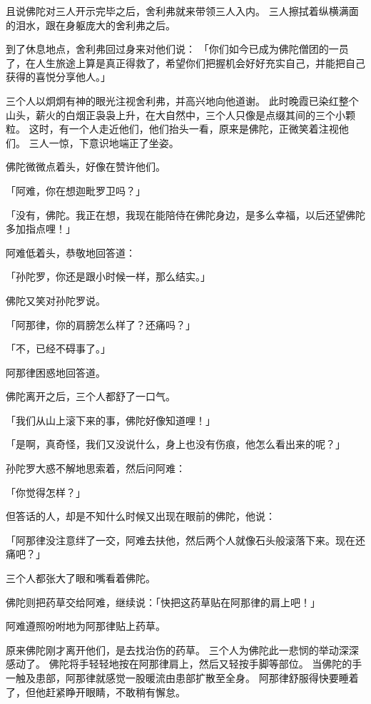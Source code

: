 \documentclass[twoside,openany]{book}
\begin{document}
且说佛陀对三人开示完毕之后，舍利弗就来带领三人入内。
三人擦拭着纵横满面的泪水，跟在身躯庞大的舍利弗之后。

到了休息地点，舍利弗回过身来对他们说：
「你们如今已成为佛陀僧团的一员了，在人生旅途上算是真正得救了，希望你们把握机会好好充实自己，并能把自己获得的喜悦分享他人。」

三个人以炯炯有神的眼光注视舍利弗，并高兴地向他道谢。
此时晚霞已染红整个山头，薪火的白烟正袅袅上升，在大自然中，三个人只像是点缀其间的三个小颗粒。
%
%
%
%
%
%
这时，有一个人走近他们，他们抬头一看，原来是佛陀，正微笑着注视他们。
三人一惊，下意识地端正了坐姿。

佛陀微微点着头，好像在赞许他们。

「阿难，你在想迦毗罗卫吗？」

「没有，佛陀。我正在想，我现在能陪侍在佛陀身边，是多么幸福，以后还望佛陀多加指点哩！」

阿难低着头，恭敬地回答道：

「孙陀罗，你还是跟小时候一样，那么结实。」

佛陀又笑对孙陀罗说。

「阿那律，你的肩膀怎么样了？还痛吗？」

「不，已经不碍事了。」

阿那律困惑地回答道。

佛陀离开之后，三个人都舒了一口气。

「我们从山上滚下来的事，佛陀好像知道哩！」

「是啊，真奇怪，我们又没说什么，身上也没有伤痕，他怎么看出来的呢？」

孙陀罗大惑不解地思索着，然后问阿难：

「你觉得怎样？」

但答话的人，却是不知什么时候又出现在眼前的佛陀，他说：

「阿那律没注意绊了一交，阿难去扶他，然后两个人就像石头般滚落下来。现在还痛吧？」

三个人都张大了眼和嘴看着佛陀。

佛陀则把药草交给阿难，继续说：「快把这药草贴在阿那律的肩上吧！」

阿难遵照吩咐地为阿那律贴上药草。

原来佛陀刚才离开他们，是去找治伤的药草。
三个人为佛陀此一悲悯的举动深深感动了。
佛陀将手轻轻地按在阿那律肩上，然后又轻按手脚等部位。
当佛陀的手一触及患部，阿那律就感觉一股暖流由患部扩散至全身。
阿那律舒服得快要睡着了，但他赶紧睁开眼睛，不敢稍有懈怠。
\end{document}
